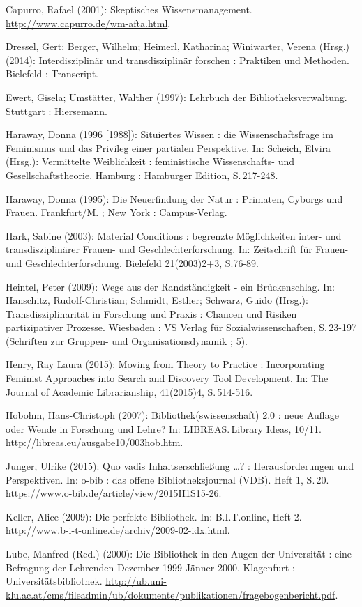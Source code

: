 Capurro, Rafael (2001): Skeptisches Wissensmanagement.
\url{http://www.capurro.de/wm-afta.html}.

Dressel, Gert; Berger, Wilhelm; Heimerl, Katharina; Winiwarter, Verena
(Hrsg.) (2014): Interdisziplinär und transdisziplinär forschen :
Praktiken und Methoden. Bielefeld : Transcript.

Ewert, Gisela; Umstätter, Walther (1997): Lehrbuch der
Bibliotheksverwaltung. Stuttgart : Hiersemann.

Haraway, Donna (1996 {[}1988{]}): Situiertes Wissen : die
Wissenschaftsfrage im Feminismus und das Privileg einer partialen
Perspektive. In: Scheich, Elvira (Hrsg.): Vermittelte Weiblichkeit :
feministische Wissenschafts- und Gesellschaftstheorie. Hamburg :
Hamburger Edition, S.\,217-248.

Haraway, Donna (1995): Die Neuerfindung der Natur : Primaten, Cyborgs
und Frauen. Frankfurt/M. ; New York : Campus-Verlag.

Hark, Sabine (2003): Material Conditions : begrenzte Möglichkeiten
inter- und transdisziplinärer Frauen- und Geschlechterforschung. In:
Zeitschrift für Frauen- und Geschlechterforschung. Bielefeld
21(2003)2+3, S.76-89.

Heintel, Peter (2009): Wege aus der Randständigkeit - ein Brückenschlag.
In: Hanschitz, Rudolf-Christian; Schmidt, Esther; Schwarz, Guido
(Hrsg.): Transdisziplinarität in Forschung und Praxis : Chancen und
Risiken partizipativer Prozesse. Wiesbaden : VS Verlag für
Sozialwissenschaften, S.\,23-197 (Schriften zur Gruppen- und
Organisationsdynamik ; 5).

Henry, Ray Laura (2015): Moving from Theory to Practice : Incorporating
Feminist Approaches into Search and Discovery Tool Development. In: The
Journal of Academic Librarianship, 41(2015)4, S.\,514-516.

Hobohm, Hans-Christoph (2007): Bibliothek(swissenschaft) 2.0 : neue
Auflage oder Wende in Forschung und Lehre? In: LIBREAS.\,Library Ideas,
10/11. \url{http://libreas.eu/ausgabe10/003hob.htm}.

Junger, Ulrike (2015): Quo vadis Inhaltserschließung \ldots{}? :
Herausforderungen und Perspektiven. In: o-bib : das offene
Bibliotheksjournal (VDB). Heft 1, S.\,20.
\url{https://www.o-bib.de/article/view/2015H1S15-26}.

Keller, Alice (2009): Die perfekte Bibliothek. In: B.I.T.online, Heft 2.
\url{http://www.b-i-t-online.de/archiv/2009-02-idx.html}.

Lube, Manfred (Red.) (2000): Die Bibliothek in den Augen der
Universität : eine Befragung der Lehrenden Dezember 1999-Jänner 2000. Klagenfurt : Universitätsbibliothek.
\url{http://ub.uni-klu.ac.at/cms/fileadmin/ub/dokumente/publikationen/fragebogenbericht.pdf}.

